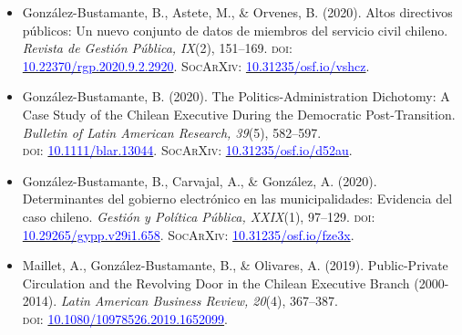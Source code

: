 \begin{publications}
\begin{itemize}
\item{González-Bustamante, B., Astete, M., \& Orvenes, B. (2020). Altos directivos públicos: Un nuevo conjunto de datos de miembros del servicio civil chileno. {\itshape Revista de Gestión Pública, IX}(2), 151--169. {\scshape doi}: \\ \href{https://doi.org/10.22370/rgp.2020.9.2.2920}{\textcolor{blue}{10.22370/rgp.2020.9.2.2920}}. {\scshape \footnotesize SocArXiv:} \href{https://doi.org/10.31235/osf.io/vshcz}{\textcolor{blue}{10.31235/osf.io/vshcz}}.}\vspace{1mm}

\item{González-Bustamante, B. (2020). The Politics-Administration Dichotomy: A Case Study of the Chilean Executive During the Democratic Post-Transition. {\itshape Bulletin of Latin American Research, 39}(5), 582--597. \\ {\scshape doi:} \href{https://doi.org/10.1111/blar.13044}{\textcolor{blue}{10.1111/blar.13044}}. {\scshape \footnotesize SocArXiv:} \href{https://doi.org/10.31235/osf.io/d52au}{\textcolor{blue}{10.31235/osf.io/d52au}}.}\vspace{1mm}


\item{González-Bustamante, B., Carvajal, A., \& González, A. (2020). Determinantes del gobierno electrónico en las municipalidades: Evidencia del caso chileno. {\itshape Gestión y Política Pública, XXIX}(1), 97--129. {\scshape doi:} \\ \href{http://dx.doi.org/10.29265/gypp.v29i1.658}{\textcolor{blue}{10.29265/gypp.v29i1.658}}. {\scshape \footnotesize SocArXiv:} \href{https://doi.org/10.31235/osf.io/fze3x}{\textcolor{blue}{10.31235/osf.io/fze3x}}.} \vspace{1mm}

\item{Maillet, A., González-Bustamante, B., \& Olivares, A. (2019). Public-Private Circulation and the Revolving Door in the Chilean Executive Branch (2000-2014). {\itshape Latin American Business Review, 20}(4), 367--387. \\ {\scshape doi:} \href{https://doi.org/10.1080/10978526.2019.1652099}{\textcolor{blue}{10.1080/10978526.2019.1652099}}.}\vspace{1mm}


\end{itemize}
\end{publications}
